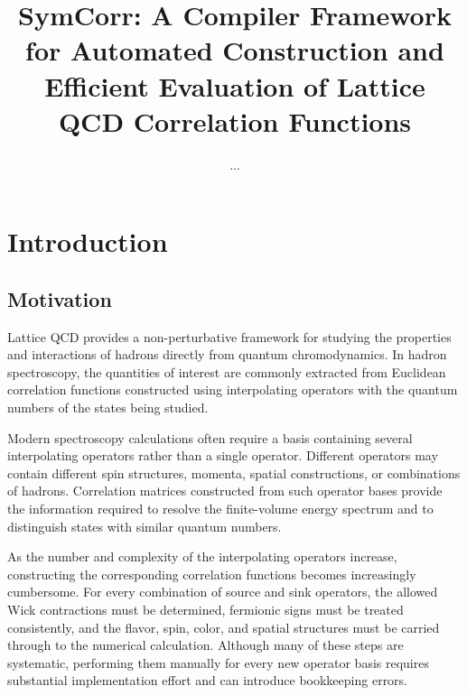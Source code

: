 \documentclass[11pt]{article}
\title{SymCorr: A Compiler Framework for Automated Construction and Efficient Evaluation of Lattice QCD Correlation Functions}
\author{...}
\date{}
\begin{document}
\maketitle

\begin{abstract}


\end{abstract}

\section{Introduction}
\label{sec:introduction}

\subsection{Motivation}

Lattice QCD provides a non-perturbative framework for studying the properties
and interactions of hadrons directly from quantum chromodynamics. In hadron
spectroscopy, the quantities of interest are commonly extracted from Euclidean
correlation functions constructed using interpolating operators with the
quantum numbers of the states being studied.

Modern spectroscopy calculations often require a basis containing several
interpolating operators rather than a single operator. Different operators may
contain different spin structures, momenta, spatial constructions, or
combinations of hadrons. Correlation matrices constructed from such operator
bases provide the information required to resolve the finite-volume energy
spectrum and to distinguish states with similar quantum numbers.

As the number and complexity of the interpolating operators increase,
constructing the corresponding correlation functions becomes increasingly
cumbersome. For every combination of source and sink operators, the allowed
Wick contractions must be determined, fermionic signs must be treated
consistently, and the flavor, spin, color, and spatial structures must be
carried through to the numerical calculation. Although many of these steps are
systematic, performing them manually for every new operator basis requires
substantial implementation effort and can introduce bookkeeping errors.
\end{document}
